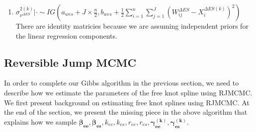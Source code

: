 \documentclass[11pt]{article}\usepackage[]{graphicx}\usepackage[]{color}
\begin{document}
\begin{enumerate}
\begin{enumerate}
\item
 $\sigma^{2(k)}_{\nu^{\Delta ES}} |\cdot \sim IG(a_{wes}+J\times \frac{n}{2},b_{wes}+\frac{1}{2}\sum_{i=1}^{n}\sum_{j=1}^{J}(W_{ij}^{\Delta ES}-X_i^{\Delta ES(k)})^2)$ \\


% 
% 
% 

There are identity matricies because we are assuming independent priors for the linear regression components. 
\end{enumerate}

\end{enumerate}



\subsection{Reversible Jump MCMC}
In order to complete our Gibbs algorithm in the previous section, we need to describe how we estimate the parameters of the free knot spline using RJMCMC. We first present background on estimating free knot splines using RJMCMC. At the end of the section, we present the missing piece in the above algorithm that explains how we sample ${\boldsymbol{\beta_{ee}},\boldsymbol{\beta_{es}}},k_{ee},k_{es}, {  r_{ee}, r_{es}}, \boldsymbol{\gamma_{ee}^{(k)}},\boldsymbol{\gamma_{es}^{(k)}}$. 
\end{document}
